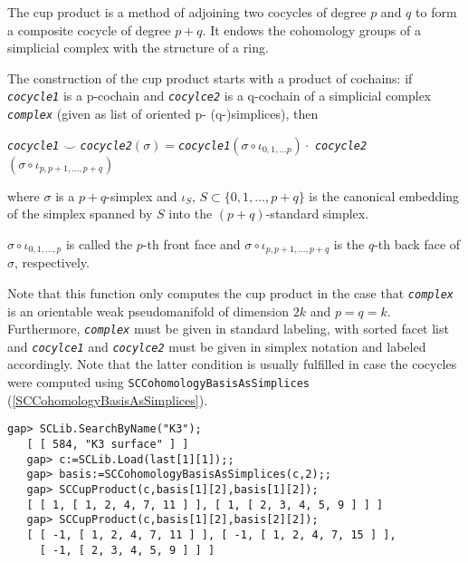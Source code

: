 \documentclass[a4paper,11pt]{report}
\begin{document}
{{{ The cup product is a method of adjoining two cocycles of degree $p$ and $q$ to form a composite cocycle of degree $p + q$. It endows the cohomology groups of a simplicial complex with the structure
of a ring. 

 The construction of the cup product starts with a product of cochains: if \mbox{\texttt{\mdseries\slshape cocycle1}} is a p-cochain and \mbox{\texttt{\mdseries\slshape cocylce2}} is a q-cochain of a simplicial complex \mbox{\texttt{\mdseries\slshape complex}} (given as list of oriented p- (q-)simplices), then

 \mbox{\texttt{\mdseries\slshape cocycle1}} $\smile$ \mbox{\texttt{\mdseries\slshape cocycle2}}$(\sigma) = $\mbox{\texttt{\mdseries\slshape cocycle1}}$(\sigma \circ \iota_{0,1, ... p}) \cdot$ \mbox{\texttt{\mdseries\slshape cocycle2}}$(\sigma \circ \iota_{p, p+1 ,..., p + q})$

 where $\sigma$ is a $p + q$-simplex and $\iota_S$, $S \subset \{0,1,...,p+q \}$ is the canonical embedding of the simplex spanned by $S$ into the $(p + q)$-standard simplex.

 $\sigma \circ \iota_{0,1, ..., p}$ is called the $p$-th front face and $\sigma \circ \iota_{p, p+1, ..., p + q}$ is the $q$-th back face of $\sigma$, respectively.

 Note that this function only computes the cup product in the case that \mbox{\texttt{\mdseries\slshape complex}} is an orientable weak pseudomanifold of dimension $2k$ and $p = q = k$. Furthermore, \mbox{\texttt{\mdseries\slshape complex}} must be given in standard labeling, with sorted facet list and \mbox{\texttt{\mdseries\slshape cocylce1}} and \mbox{\texttt{\mdseries\slshape cocylce2}} must be given in simplex notation and labeled accordingly. Note that the
latter condition is usually fulfilled in case the cocycles were computed using \texttt{SCCohomologyBasisAsSimplices} (\ref{SCCohomologyBasisAsSimplices}). 
\begin{Verbatim}[commandchars=!@|,fontsize=\small,frame=single,label=Example]
   gap> SCLib.SearchByName("K3");
   [ [ 584, "K3 surface" ] ]
   gap> c:=SCLib.Load(last[1][1]);;                                     
   gap> basis:=SCCohomologyBasisAsSimplices(c,2);;
   gap> SCCupProduct(c,basis[1][2],basis[1][2]);
   [ [ 1, [ 1, 2, 4, 7, 11 ] ], [ 1, [ 2, 3, 4, 5, 9 ] ] ]
   gap> SCCupProduct(c,basis[1][2],basis[2][2]);
   [ [ -1, [ 1, 2, 4, 7, 11 ] ], [ -1, [ 1, 2, 4, 7, 15 ] ], 
     [ -1, [ 2, 3, 4, 5, 9 ] ] ]
   
\end{Verbatim}
 }

}}
\end{document}
